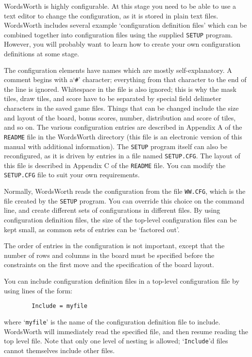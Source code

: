 WordsWorth is highly configurable. At this stage you need
to be able to use a text editor to change the configuration,
as it is stored in plain text files. WordsWorth includes
several example `configuration definition files' which can
be combined together into configuration files using the 
supplied {\tt SETUP} program. However, you will probably want to 
learn how to create your own configuration definitions at 
some stage.

The configuration elements have names which are mostly
self-explanatory. A comment begins with a`{\tt \#}' character;
everything from that character to the end of the line is 
ignored. Whitespace in the file is also ignored; this is
why the mask tiles, draw tiles, and score have to be
separated by special field delimeter characters in the
saved game files. Things that can be changed include the
size and layout of the board, bonus scores, number,
distribution and score of tiles, and so on. The various
configuration entries are described in Appendix A of the 
{\tt README} file in the WordsWorth directory (this file is an 
electronic version of this manual with additional information). The
{\tt SETUP} program itself can also be reconfigured, as it is
driven by entries in a file named {\tt SETUP.CFG}. The layout
of this file is described in Appendix C of the {\tt README} file.
You can modify the {\tt SETUP.CFG} file to suit your own requirements.

Normally, WordsWorth reads the configuration from the file 
{\tt WW.CFG}, which is the file created by the {\tt SETUP} program. You
can override this choice on the command line, and create
different sets of configurations in different files. By using
configuration definition files, the size of the top-level 
configuration files can be kept small, as common sets of
entries can be `factored out'.

The order of entries in the configuration is not important,
except that the number of rows and columns in the board must
be specified before the constraints on the first move and the
specification of the board layout.

You can include configuration definition files in a top-level 
configuration file by using lines of the form:

\begin{verbatim}
        Include = myfile
\end{verbatim}

where `{\tt myfile}' is the name of the configuration definition file
to include. WordsWorth will immediately read the specified file,
and then resume reading the top level file. Note that only one
level of nesting is allowed; `{\tt Include}'d files cannot themselves
include other files. 

